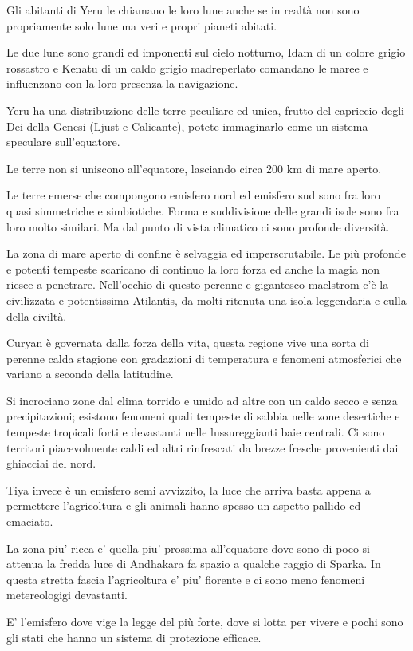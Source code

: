 \documentclass[a4paper,11pt,twoside,openany]{book}
\begin{document}
Gli abitanti di Yeru le chiamano le loro lune anche se in realtà non sono propriamente solo lune ma veri e propri pianeti abitati.

Le due lune sono grandi ed imponenti sul cielo notturno, Idam di un colore grigio rossastro e Kenatu di un caldo grigio madreperlato comandano le maree e influenzano con la loro presenza la navigazione.

Yeru ha una distribuzione delle terre peculiare ed unica, frutto del capriccio degli Dei della Genesi (Ljust e Calicante), potete immaginarlo come un sistema speculare sull'equatore.

Le terre non si uniscono all'equatore, lasciando circa 200 km di mare aperto.

Le terre emerse che compongono emisfero nord ed emisfero sud sono fra loro quasi simmetriche e simbiotiche. Forma e suddivisione delle grandi isole sono fra loro molto similari. Ma dal punto di vista climatico ci sono profonde diversità.

La zona di mare aperto di confine è selvaggia ed imperscrutabile. Le più profonde e potenti tempeste scaricano di continuo la loro forza ed anche la magia non riesce a penetrare. Nell'occhio di questo perenne e gigantesco maelstrom c'è la civilizzata e potentissima Atilantis, da molti ritenuta una isola leggendaria e culla della civiltà.

Curyan è governata dalla forza della vita, questa regione vive una sorta di perenne calda stagione con gradazioni di temperatura e fenomeni atmosferici che variano a seconda della latitudine.

Si incrociano zone dal clima torrido e umido ad altre con un caldo secco e senza precipitazioni; esistono fenomeni quali tempeste di sabbia nelle zone desertiche e tempeste tropicali forti e devastanti nelle lussureggianti baie centrali.
Ci sono territori piacevolmente caldi ed altri rinfrescati da brezze fresche provenienti dai ghiacciai del nord.

Tiya invece è un emisfero semi avvizzito, la luce che arriva basta appena a permettere l'agricoltura e gli animali hanno spesso un aspetto pallido ed emaciato.

La zona piu' ricca e' quella piu' prossima all'equatore dove sono di poco si attenua la fredda luce di Andhakara fa spazio a qualche raggio di Sparka.
In questa stretta fascia l'agricoltura e' piu' fiorente e ci sono meno fenomeni metereologigi devastanti.

E' l'emisfero dove vige la legge del più forte, dove si lotta per vivere e pochi sono gli stati che hanno un sistema di protezione efficace.
\end{document}
